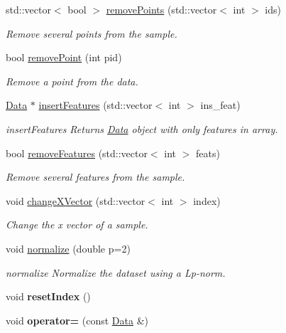 \begin{DoxyCompactItemize}
std\+::vector$<$ bool $>$ \hyperlink{class_data_a6cc376e614e5440061c66833e1c8d30a}{remove\+Points} (std\+::vector$<$ int $>$ ids)
\begin{DoxyCompactList}\small\item\em Remove several points from the sample. \end{DoxyCompactList}\item 
bool \hyperlink{class_data_ad927494a13a5018ff3644212d7234a03}{remove\+Point} (int pid)
\begin{DoxyCompactList}\small\item\em Remove a point from the data. \end{DoxyCompactList}\item 
\hyperlink{class_data}{Data} $\ast$ \hyperlink{class_data_a5eb92a397e4eafb02f3c012658c78b37}{insert\+Features} (std\+::vector$<$ int $>$ ins\+\_\+feat)
\begin{DoxyCompactList}\small\item\em insert\+Features Returns \hyperlink{class_data}{Data} object with only features in array. \end{DoxyCompactList}\item 
bool \hyperlink{class_data_a0e0136f31687452ff10b489f8804ceb8}{remove\+Features} (std\+::vector$<$ int $>$ feats)
\begin{DoxyCompactList}\small\item\em Remove several features from the sample. \end{DoxyCompactList}\item 
void \hyperlink{class_data_a3e66e3dce7675bf2a1eded906e3d7912}{change\+X\+Vector} (std\+::vector$<$ int $>$ index)
\begin{DoxyCompactList}\small\item\em Change the x vector of a sample. \end{DoxyCompactList}\item 
void \hyperlink{class_data_a38bbab57bd9d871bd78771df47529d6b}{normalize} (double p=2)
\begin{DoxyCompactList}\small\item\em normalize Normalize the dataset using a Lp-\/norm. \end{DoxyCompactList}\item 
\mbox{\label{class_data_a92a70787d983df3d92b3b93a947aea8c}} 
void {\bfseries reset\+Index} ()
\item 
\mbox{\label{class_data_a02affbc0f8564106c84dc59f34666912}} 
void {\bfseries operator=} (const \hyperlink{class_data}{Data} \&)
\end{DoxyCompactItemize}
